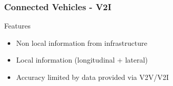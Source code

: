 \begin{frame}
\frametitle{Connected Vehicles - V2I}
    \begin{center}
        \resizebox{0.9\linewidth}{!}{%
            
        }
        \begin{exampleblock}{Features}
            \begin{itemize}
                \item Non local information from infrastructure 
                \item Local information (longitudinal + lateral)
                \item Accuracy limited by data provided via V2V/V2I
            \end{itemize}
        \end{exampleblock}
    \end{center}
\end{frame}